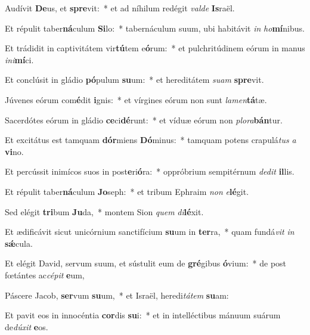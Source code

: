\item Audívit \textbf{De}us, et \textbf{spre}vit:~* et ad níhilum redégit \textit{val}\textit{de} \textbf{Is}raël.
\item Et répulit taber\textbf{ná}culum \textbf{Si}lo:~* tabernáculum suum, ubi habitávit \textit{in} \textit{ho}\textbf{mí}nibus.
\item Et trádidit in captivitátem vir\textbf{tú}tem e\textbf{ó}rum:~* et pulchritúdinem eórum in manus \textit{in}\textit{i}\textbf{mí}ci.
\item Et conclúsit in gládio \textbf{pó}pulum \textbf{su}um:~* et hereditátem \textit{su}\textit{am} \textbf{spre}vit.
\item Júvenes eórum com\textbf{é}dit \textbf{i}gnis:~* et vírgines eórum non sunt \textit{la}\textit{men}\textbf{tá}tæ.
\item Sacerdótes eórum in gládio \textbf{ce}ci\textbf{dé}runt:~* et víduæ eórum non \textit{plo}\textit{ra}\textbf{bán}tur.
\item Et excitátus est tamquam \textbf{dór}miens \textbf{Dó}minus:~* tamquam potens crapulá\textit{tus} \textit{a} \textbf{vi}no.
\item Et percússit inimícos suos in post\textbf{e}ri\textbf{ó}ra:~* oppróbrium sempitérnum \textit{de}\textit{dit} \textbf{il}lis.
\item Et répulit taber\textbf{ná}culum \textbf{Jo}seph:~* et tribum Ephraim \textit{non} \textit{e}\textbf{lé}git.
\item Sed elégit \textbf{tri}bum \textbf{Ju}da,~* montem Sion \textit{quem} \textit{di}\textbf{lé}xit.
\item Et ædificávit sicut unicórnium sanctifícium \textbf{su}um in \textbf{ter}ra,~* quam fundá\textit{vit} \textit{in} \textbf{sǽ}cula.
\item Et elégit David, servum suum, et sústulit eum de \textbf{gré}gibus \textbf{ó}vium:~* de post fœtántes ac\textit{cé}\textit{pit} \textbf{e}um,
\item Páscere Jacob, \textbf{ser}vum \textbf{su}um,~* et Israël, heredi\textit{tá}\textit{tem} \textbf{su}am:
\item Et pavit eos in innocéntia \textbf{cor}dis \textbf{su}i:~* et in intelléctibus mánuum suárum de\textit{dú}\textit{xit} \textbf{e}os.
